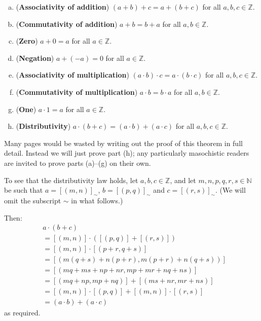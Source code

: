 \begin{theorem}
\label{thmZIsARing}
\fixlistskip%
\begin{enumerate}[(a)]
\item (\textbf{Associativity of addition}) $(a+b)+c = a+(b+c)$ for all $a,b,c \in \mathbb{Z}$.
\item (\textbf{Commutativity of addition}) $a+b=b+a$ for all $a,b \in \mathbb{Z}$.
\item (\textbf{Zero}) $a+0 = a$ for all $a \in \mathbb{Z}$.
\item (\textbf{Negation}) $a + (-a) = 0$ for all $a \in \mathbb{Z}$.
\item (\textbf{Associativity of multiplication}) $(a \cdot b) \cdot c = a \cdot (b \cdot c)$ for all $a,b,c \in \mathbb{Z}$.
\item (\textbf{Commutativity of multiplication}) $a \cdot b = b \cdot a$ for all $a,b \in \mathbb{Z}$.
\item (\textbf{One}) $a \cdot 1 = a$ for all $a \in \mathbb{Z}$.
\item (\textbf{Distributivity}) $a \cdot (b + c) = (a \cdot b) + (a \cdot c)$ for all $a,b,c \in \mathbb{Z}$.
\end{enumerate}
\end{theorem}

\begin{cproof}
Many pages would be wasted by writing out the proof of this theorem in full detail. Instead we will just prove part (h); any particularly masochistic readers are invited to prove parts (a)--(g) on their own.

To see that the distributivity law holds, let $a,b,c \in \mathbb{Z}$, and let $m,n,p,q,r,s \in \mathbb{N}$ be such that $a = [(m,n)]_{\sim}$, $b = [(p,q)]_{\sim}$ and $c = [(r,s)]_{\sim}$. (We will omit the subscript $\sim$ in what follows.)

Then:
\begin{align*}
& a \cdot (b + c) \\
&= [(m,n)] \cdot ([(p,q)] + [(r,s)]) \\
&= [(m,n)] \cdot [(p+r,q+s)] \\
&= [(m(q+s)+n(p+r), m(p+r) + n(q+s))] \\
&= [(mq+ms+np+nr, mp+mr+nq+ns)] \\
&= [(mq+np, mp+nq)] + [(ms+nr, mr+ns)] \\
&= [(m,n)] \cdot [(p,q)] + [(m,n)] \cdot [(r,s)] \\
&= (a \cdot b) + (a \cdot c)
\end{align*}
as required.
\end{cproof}

